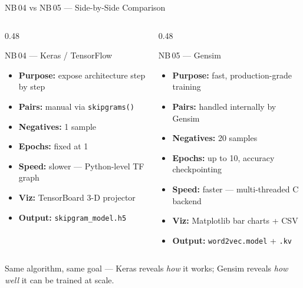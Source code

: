\documentclass[11pt,aspectratio=169,professionalfonts]{beamer}
\begin{document}
\begin{frame}{NB\,04 vs NB\,05 — Side-by-Side Comparison}

\begin{columns}[T]
  \begin{column}{0.48\textwidth}
    \begin{block}{NB\,04 — Keras / TensorFlow}
      \begin{itemize}\small
        \item \textbf{Purpose:} expose architecture step by step
        \item \textbf{Pairs:} manual via \texttt{skipgrams()}
        \item \textbf{Negatives:} 1 sample
        \item \textbf{Epochs:} fixed at 1
        \item \textbf{Speed:} slower — Python-level TF graph
        \item \textbf{Viz:} TensorBoard 3-D projector
        \item \textbf{Output:} \texttt{skipgram\_model.h5}
      \end{itemize}
    \end{block}
  \end{column}
  \begin{column}{0.48\textwidth}
    \begin{block}{NB\,05 — Gensim}
      \begin{itemize}\small
        \item \textbf{Purpose:} fast, production-grade training
        \item \textbf{Pairs:} handled internally by Gensim
        \item \textbf{Negatives:} 20 samples
        \item \textbf{Epochs:} up to 10, accuracy checkpointing
        \item \textbf{Speed:} faster — multi-threaded C backend
        \item \textbf{Viz:} Matplotlib bar charts + CSV
        \item \textbf{Output:} \texttt{word2vec.model} + \texttt{.kv}
      \end{itemize}
    \end{block}
  \end{column}
\end{columns}

\vspace{0.5em}
\begin{alertblock}{}
  \centering\small
  Same algorithm, same goal — Keras reveals \textit{how} it works;
  Gensim reveals \textit{how well} it can be trained at scale.
\end{alertblock}

\end{frame}
\end{document}
